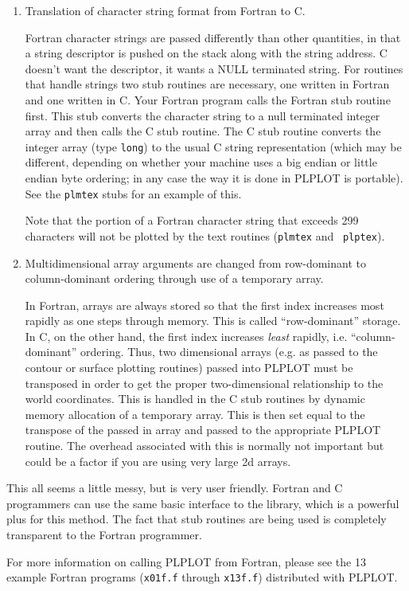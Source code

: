 \begin{enumerate}
\item Translation of character string format from Fortran to C.

Fortran character strings are passed differently than other quantities, in
that a string descriptor is pushed on the stack along with the string
address.  C doesn't want the descriptor, it wants a NULL terminated string.
For routines that handle strings two stub routines are necessary, one
written in Fortran and one written in C.  Your Fortran program calls the
Fortran stub routine first.  This stub converts the character string to a
null terminated integer array and then calls the C stub routine.  The C
stub routine converts the integer array (type {\tt long}) to the usual C
string representation (which may be different, depending on whether your
machine uses a big endian or little endian byte ordering; in any case the
way it is done in PLPLOT is portable).  See the {\tt plmtex} stubs for an
example of this. 

Note that the portion of a Fortran character string that exceeds 299
characters will not be plotted by the text routines ({\tt plmtex} and {\tt
plptex}). 

\item Multidimensional array arguments are changed from row-dominant to
column-dominant ordering through use of a temporary array.

In Fortran, arrays are always stored so that the first index increases most
rapidly as one steps through memory.  This is called ``row-dominant''
storage.  In C, on the other hand, the first index increases {\em least\/}
rapidly, i.e. ``column-dominant'' ordering.  Thus, two dimensional arrays
(e.g.  as passed to the contour or surface plotting routines) passed into
PLPLOT must be transposed in order to get the proper two-dimensional
relationship to the world coordinates.  This is handled in the C stub
routines by dynamic memory allocation of a temporary array.  This is then set
equal to the transpose of the passed in array and passed to the appropriate
PLPLOT routine.  The overhead associated with this is normally not important
but could be a factor if you are using very large 2d arrays.
\end{enumerate}

This all seems a little messy, but is very user friendly.  Fortran and C
programmers can use the same basic interface to the library, which is a
powerful plus for this method.  The fact that stub routines are being used
is completely transparent to the Fortran programmer.

For more information on calling PLPLOT from Fortran, please see the 13
example Fortran programs ({\tt x01f.f} through {\tt x13f.f}) distributed
with PLPLOT.
